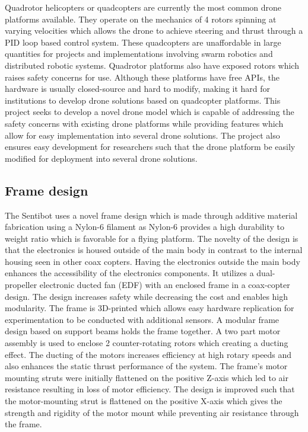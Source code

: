 \documentclass[12pt]{article}
\begin{document}
Quadrotor helicopters or quadcopters are currently the most common drone platforms available. They operate on the mechanics of 4 rotors spinning at varying velocities which allows the drone to achieve steering and thrust through a PID loop based control system\cite{Multiwii}. These quadcopters are unaffordable in large quantities for projects and implementations involving swarm robotics and distributed robotic systems. Quadrotor platforms also have exposed rotors which raises safety concerns for use. Although these platforms have free APIs, the hardware is usually closed-source and hard to modify, making it hard for institutions to develop drone solutions based on quadcopter platforms. This project seeks to develop a novel drone model which is capable of addressing the safety concerns with existing drone platforms while providing features which allow for easy implementation into several drone solutions. The project also ensures easy development for researchers such that the drone platform be easily modified for deployment into several drone solutions.
 
\subsection{Frame design}

The Sentibot uses a novel frame design which is made through additive material fabrication using a Nylon-6 filament as Nylon-6 provides a high durability to weight ratio which is favorable for a flying platform\cite{3Dprinting}. The novelty of the design is that the electronics is housed outside of the main body in contrast to the internal housing seen in other coax copters\cite{SFV}. Having the electronics outside the main body enhances the accessibility of the electronics components. It utilizes a dual-propeller electronic ducted fan (EDF) with an enclosed frame in a coax-copter design. The design increases safety while decreasing the cost and enables high modularity. The frame is 3D-printed which allows easy hardware replication for experimentation to be conducted with additional sensors. A modular frame design based on support beams holds the frame together.  A two part motor assembly is used to enclose 2 counter-rotating rotors which creating a ducting effect. The ducting of the motors increases efficiency at high rotary speeds and also enhances the static thrust performance of the system\cite{ductedfan}. The frame's motor mounting struts were initially flattened on the positive Z-axis which led to air resistance resulting in loss of motor efficiency. The design is improved such that the motor-mounting strut is flattened on the positive X-axis which gives the strength and rigidity of the motor mount while preventing air resistance through the frame.
\end{document}
